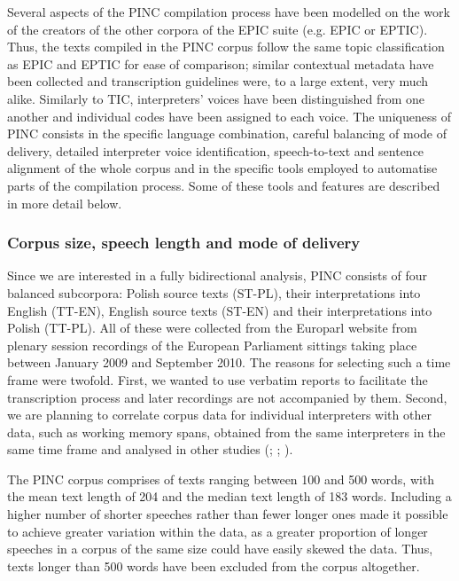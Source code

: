 \documentclass[output=paper]{langscibook}
\begin{document}
Several aspects of the PINC compilation process have been modelled on the work of the creators of the other corpora of the EPIC suite (e.g. EPIC or EPTIC). Thus, the texts compiled in the PINC corpus follow the same topic classification as EPIC and EPTIC for ease of comparison; similar contextual metadata have been collected and transcription guidelines were, to a large extent, very much alike. Similarly to TIC, interpreters’ voices have been distinguished from one another and individual codes have been assigned to each voice. The uniqueness of PINC consists in the specific language combination, careful balancing of mode of delivery, detailed interpreter voice identification, speech-to-text and sentence alignment of the whole corpus and in the specific tools employed to automatise parts of the compilation process. Some of these tools and features are described in more detail below.

 \subsubsection{Corpus size, speech length and mode of delivery}\label{sec:chmiel:2.1.1}

Since we are interested in a fully bidirectional analysis, PINC consists of four balanced subcorpora: Polish source texts (ST-PL), their interpretations into English (TT-EN), English source texts (ST-EN) and their interpretations into Polish (TT-PL). All of these were collected from the Europarl website from plenary session recordings of the European Parliament sittings taking place between January 2009 and September 2010. The reasons for selecting such a time frame were twofold. First, we wanted to use verbatim reports to facilitate the transcription process and later recordings are not accompanied by them. Second, we are planning to correlate corpus data for individual interpreters with other data, such as working memory spans, obtained from the same interpreters in the same time frame and analysed in other studies (\citealt{Chmiel2012}; \citealt{Chmiel2016}; \citealt{Chmiel2018}). 

The PINC corpus comprises of texts ranging between 100 and 500 words, with the mean text length of 204 and the median text length of 183 words. Including a higher number of shorter speeches rather than fewer longer ones made it possible to achieve greater variation within the data, as a greater proportion of longer speeches in a corpus of the same size could have easily skewed the data. Thus, texts longer than 500 words have been excluded from the corpus altogether. 
\end{document}
